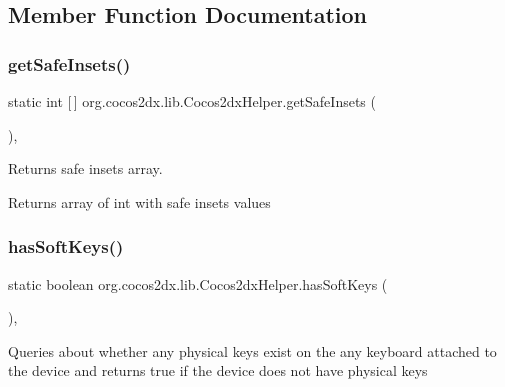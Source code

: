 \subsection{Member Function Documentation}
\mbox{\label{classorg_1_1cocos2dx_1_1lib_1_1Cocos2dxHelper_a6388eed9987d727fcfc513cb47f979dc}} 
\subsubsection{\texorpdfstring{get\+Safe\+Insets()}{getSafeInsets()}}
{\footnotesize\ttfamily static int \mbox{[}$\,$\mbox{]} org.\+cocos2dx.\+lib.\+Cocos2dx\+Helper.\+get\+Safe\+Insets (\begin{DoxyParamCaption}{ }\end{DoxyParamCaption})\hspace{0.3cm}{\ttfamily [inline]}, {\ttfamily [static]}}

Returns safe insets array.

\begin{DoxyReturn}{Returns}
array of int with safe insets values 
\end{DoxyReturn}
\mbox{\label{classorg_1_1cocos2dx_1_1lib_1_1Cocos2dxHelper_a2c49b4d758be4ba6f6c51e3e2baca25c}} 
\subsubsection{\texorpdfstring{has\+Soft\+Keys()}{hasSoftKeys()}}
{\footnotesize\ttfamily static boolean org.\+cocos2dx.\+lib.\+Cocos2dx\+Helper.\+has\+Soft\+Keys (\begin{DoxyParamCaption}{ }\end{DoxyParamCaption})\hspace{0.3cm}{\ttfamily [inline]}, {\ttfamily [static]}}

Queries about whether any physical keys exist on the any keyboard attached to the device and returns {\ttfamily true} if the device does not have physical keys

